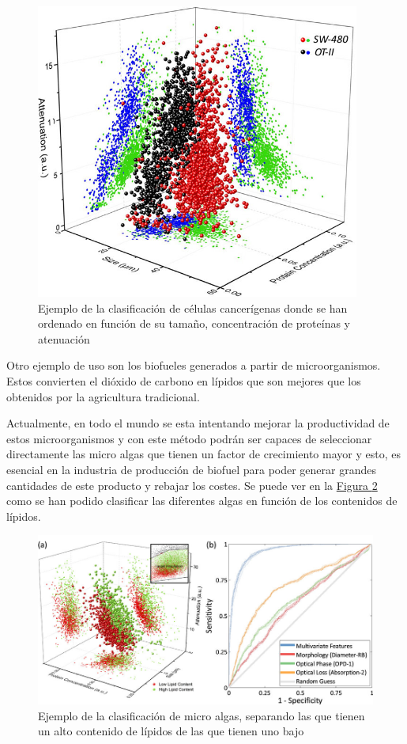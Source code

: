 \documentclass[a4paper, 12pt, UTF8]{article}
\begin{document}
\begin{figure}[H]
	\centering
	\includegraphics[width=0.95\textwidth]{impacto_1}
	\caption{Ejemplo de la clasificación de células cancerígenas donde se han ordenado en función de su tamaño, concentración de proteínas y atenuación}
	\label{fig:impacto_1}
\end{figure}

Otro ejemplo de uso son los biofueles generados a partir de microorganismos. Estos convierten el dióxido de carbono en lípidos que son mejores que los obtenidos por la agricultura tradicional. 

Actualmente, en todo el mundo se esta intentando mejorar la productividad de estos microorganismos y con este método podrán ser capaces de seleccionar directamente las micro algas que tienen un factor de crecimiento mayor y esto, es esencial en la industria de producción de biofuel para poder generar grandes cantidades de este producto y rebajar los costes. Se puede ver en la \hyperref[fig:impacto_2]{Figura \ref{fig:impacto_2}} como se han podido clasificar las diferentes algas en función de los contenidos de lípidos.

\begin{figure}[H]
	\centering
	\includegraphics[width=\linewidth]{impacto_2}
	\caption{Ejemplo de la clasificación de micro algas, separando las que tienen un alto contenido de lípidos de las que tienen uno bajo}
	\label{fig:impacto_2}
\end{figure}
\end{document}
